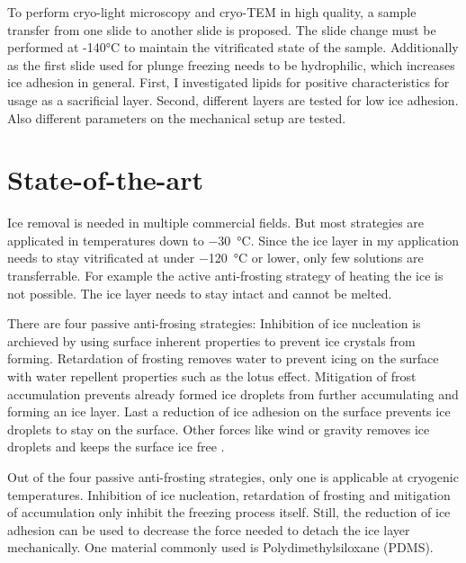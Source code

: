 To perform cryo-light microscopy and cryo-TEM in high quality, a sample transfer from one slide to another slide is proposed. The slide change must be performed at -140°C to maintain the vitrificated state of the sample. Additionally as the first slide used for plunge freezing needs to be hydrophilic, which increases ice adhesion in general. First, I investigated lipids for positive characteristics for usage as a sacrificial layer. Second, different layers are tested for low ice adhesion. Also different parameters on the mechanical setup are tested.

\section{State-of-the-art}

Ice removal is needed in multiple commercial fields. But most strategies are applicated in temperatures down to \SI{-30}{\degreeCelsius}. Since the ice layer in my application needs to stay vitrificated at under \SI{-120}{\degreeCelsius} or lower, only few solutions are transferrable. For example the active anti-frosting strategy of heating the ice is not possible. The ice layer needs to stay intact and cannot be melted.


There are four passive anti-frosing strategies: Inhibition of ice nucleation is archieved by using surface inherent properties to prevent ice crystals from forming. Retardation of frosting removes water to prevent icing on the surface with water repellent properties such as the lotus effect. Mitigation of frost accumulation prevents already formed ice droplets from further accumulating and forming an ice layer. Last a reduction of ice adhesion on the surface prevents ice droplets to stay on the surface. Other forces like wind or gravity removes ice droplets and keeps the surface ice free \cite{Yang.2021}. 

Out of the four passive anti-frosting strategies, only one is applicable at cryogenic temperatures. Inhibition of ice nucleation, retardation of frosting and mitigation of accumulation only inhibit the freezing process itself. Still, the reduction of ice adhesion can be used to decrease the force needed to detach the ice layer mechanically. One material commonly used is Polydimethylsiloxane (PDMS).

